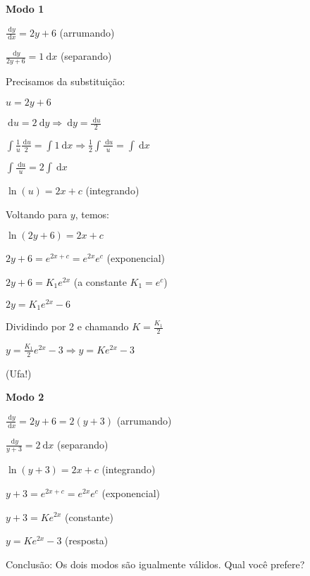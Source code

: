 \documentclass[a4paper]{article}
\newcommand{\ud}{\mathrm{\ d}}
\begin{document}
\begin{multicols}{2}
{\bf Modo 1}

\smallskip

$\frac{\ud y}{\ud x} = 2y + 6$ (arrumando)

\smallskip

$\frac{\ud y}{2y+6} = 1\ud x$ (separando)

\smallskip
Precisamos da substituição:

$u = 2y+6$

\smallskip

$\ud u=2\ud y \Rightarrow \ud y = \frac{\ud u}{2}$

\smallskip

$\int \frac{1}{u} \frac{\ud u}{2} = \int 1 \ud x \Rightarrow \frac{1}{2}\int
\frac{\ud u}{u} = \int \ud x$

\smallskip

$\int \frac{\ud u}{u} = 2\int \ud x$

\smallskip

$\ln (u) = 2x+c$ (integrando)

\smallskip

Voltando para $y$, temos:

\smallskip

$\ln(2y+6)= 2x+c$

\smallskip

$2y+6 = e^{2x+c}=e^{2x}e^c$ (exponencial)

\smallskip

$2y+6=K_1e^{2x}$ (a constante $K_1 = e^c$)

\smallskip

$2y=K_1e^{2x} -6$

\smallskip

Dividindo por 2 e chamando $K = \frac{K_1}{2}$

\smallskip

$y=\frac{K_1}{2}e^{2x} -3 \Rightarrow y=Ke^{2x}-3$

\smallskip

(Ufa!)

\columnbreak
{\bf Modo 2}

\smallskip

$\frac{\ud y}{\ud x} = 2y + 6 = 2(y+3)$ (arrumando)

\smallskip

$\frac{\ud y}{y+3} = 2\ud x$ (separando)

\smallskip

$\ln (y+3) = 2x+c$ (integrando)

\smallskip

$y+3 = e^{2x+c} = e^{2x}e^c$ (exponencial)

\smallskip

$y +3 = Ke^{2x}$ (constante)
\smallskip

$y = Ke^{2x} - 3$ (resposta)
\end{multicols}


\bigskip
Conclusão: Os dois modos são igualmente válidos. Qual você prefere?
\end{document}
